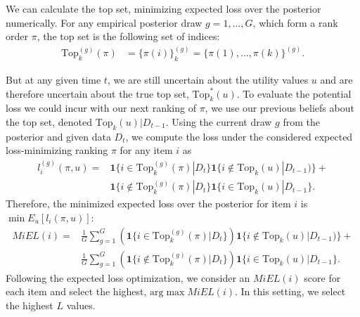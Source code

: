 \documentclass[nonblindrev]{informs3}
\newcommand{\topset}{\text{Top}_k}
\begin{document}
We can calculate the top set, minimizing expected loss over the posterior numerically. For any empirical posterior draw $g=1,\ldots,G$, which form a rank order $\pi$, the top set is the following set of indices:
\begin{align}
\topset^{(g)}(\pi) &= \{ \pi(i) \}_k^{(g)} = \{ \pi(1),\ldots,\pi(k) \}^{(g)}.
\end{align}


%
%


But at any given time $t$, we are still uncertain about the utility values $u$ and are therefore uncertain about the true top set, $\topset^{*}(u)$. To evaluate the potential loss we could incur with our next ranking of $\pi$, we use our previous beliefs about the top set, denoted $\topset(u) | D_{t-1}$. Using the current draw $g$ from the posterior and given data $D_{t}$, we compute the loss under the considered expected loss-minimizing ranking $\pi$ for any item $i$ as  
\begin{align}
l_i^{(g)}(\pi,u) = 
& \mathbf{1}\{ i \in \topset^{(g)}(\pi) | D_{t} \} 
  \mathbf{1}\{ i \notin \topset(u) | D_{t-1} ) \} + \nonumber \\
& \mathbf{1}\{ i \notin \topset^{(g)}(\pi) | D_{t} \} 
  \mathbf{1}\{ i \in \topset(u)| D_{t-1} \}.  
\end{align}
Therefore, the minimized expected loss over the posterior for item $i$ is $\min E_{u}[l_i(\pi,u)]$:
\begin{align}
MiEL(i) =  
& \frac{1}{G} \sum_{g=1}^{G} 
   \left( \mathbf{1}\{ i \in \topset^{(g)}(\pi) | D_{t} \} \right)
  \mathbf{1}\{ i \notin \topset(u) | D_{t-1} ) \} + \nonumber \\ 
& \frac{1}{G} \sum_{g=1}^{G}
   \left( \mathbf{1}\{ i \notin \topset^{(g)}(\pi) | D_{t} \} \right)
  \mathbf{1}\{ i \in \topset(u)| D_{t-1} \}.  
\end{align}
Following the expected loss optimization, we consider an $MiEL(i)$ score for each item and select the highest, $\text{arg}\max MiEL(i)$. In this setting, we select the highest $L$ values.
\end{document}
